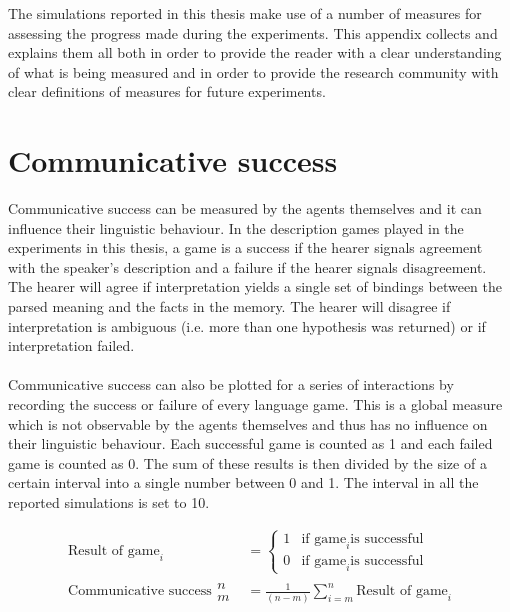
\label{a:measures}

The simulations reported in this thesis make use of a number of measures for assessing the progress made during the experiments. This appendix collects and explains them all both in order to provide the reader with a clear understanding of what is being measured and in order to provide the research community with clear definitions of measures for future experiments.

\section*{Communicative success}

 Communicative success can be measured by the agents themselves and it can influence their linguistic behaviour. In the description games played in the experiments in this thesis, a game is a success if the hearer signals agreement with the speaker's description and a failure if the hearer signals disagreement. The hearer will agree if interpretation yields a single set of bindings between the parsed meaning and the facts in the memory. The hearer will disagree if interpretation is ambiguous (i.e. more than one hypothesis was returned) or if interpretation failed.
\\
\\
 Communicative success can also be plotted for a series of interactions by recording the success or failure of every language game. This is a global measure which is not observable by the agents themselves and thus has no influence on their linguistic behaviour. Each successful game is counted as 1 and each failed game is counted as 0. The sum of these results is then divided by the size of a certain interval into a single number between 0 and 1. The interval in all the reported simulations is set to 10.

\begin{align*}
\text{Result of game}_i &= \left\{ 
\begin{array}{ll} 
1 & \text{if game}_i \text{is successful} \\
0 & \text{if game}_i \text{is successful}
\end{array} \right.
\\
\text{Communicative success}
\begin{array}{ll}
n \\
m
\end{array}
 &= \frac{1}{(n-m)} \sum_{i=m}^n \text{Result of game}_i
\end{align*}

